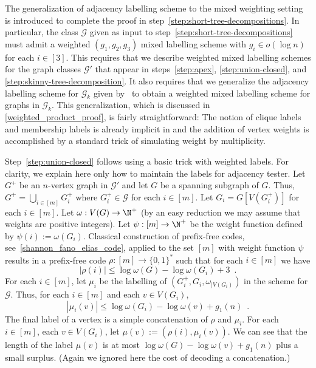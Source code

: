 

The generalization of adjacency labelling scheme
to the mixed weighting setting
is introduced to complete the proof in step~\ref{step:short-tree-decompositions}.  In particular, the class $\mathcal{G}$ given as input to step~\ref{step:short-tree-decompositions} must admit a weighted $(g_1,g_2,g_3)$ mixed labelling scheme with $g_i\in o(\log n)$ for each $i\in[3]$.  This requires that we describe weighted mixed labelling schemes for the graph classes $\mathcal{G}'$ that appear in steps~\ref{step:apex}, \ref{step:union-closed}, and \ref{step:skinny-tree-decomposition}.  It also requires that we generalize the adjacency labelling scheme for $\mathcal{G}_k$ given by~\citet{dujmovic.esperet.ea:adjacency} to obtain a weighted mixed labelling scheme for graphs in $\mathcal{G}_k$.
This generalization, which is discussed in \cref{weighted_product_proof}, is fairly straightforward: The notion of clique labels and membership labels is already implicit in \cite{dujmovic.esperet.ea:adjacency} and the addition of vertex weights is accomplished by a  standard trick of simulating weight by multiplicity.

Step~\ref{step:union-closed} follows using a basic trick with weighted labels.
For clarity, we explain here only how to maintain the labels for adjacency tester.
Let $G^+$ be an $n$-vertex graph in $\mathcal{G}'$ and let $G$ be a spanning subgraph of $G$.
Thus,
$G^+=\bigcup_{i\in[m]}G^+_i$ where $G^+_i\in\mathcal{G}$ for each $i\in[m]$.
Let $G_i=G[V(G^+_i)]$ for each $i\in[m]$.
Let $\omega: V(G)\to\N^+$ (by an easy reduction we may assume that weights are positive integers).
Let $\psi:[m]\to\N^+$ be the weight function defined by $\psi(i):=\omega(G_i)$.
Classical construction of prefix-free codes,
see~\cref{shannon_fano_elias_code}, applied to the set $[m]$ with weight function $\psi$
results in a prefix-free code $\rho:[m]\to\{0,1\}^*$ such that for each $i\in[m]$ we have
\[
  |\rho(i)|\le\log \omega(G)-\log \omega(G_i)+3\enspace.
\]
For each $i\in[m]$,
let $\mu_i$ be the labelling of $(G_i^+,G_i,\omega_{|V(G_i)})$ in the scheme for $\mathcal{G}$.
Thus, for each $i\in[m]$ and each $v\in V(G_i)$,
\[
  |\mu_i(v)| \le \log\omega(G_i) - \log\omega(v) + g_1(n)\enspace.
\]
The final label of a vertex is a simple concatenation of $\rho$ and $\mu_i$.
For each $i\in[m]$, each $v\in V(G_i)$, let
$\mu(v):=(\rho(i),\mu_i(v))$.
We can see that the length of the label $\mu(v)$ is at most $\log\omega(G)-\log\omega(v)+g_1(n)$ plus a small surplus.
(Again we ignored here the cost of decoding a concatenation.)

